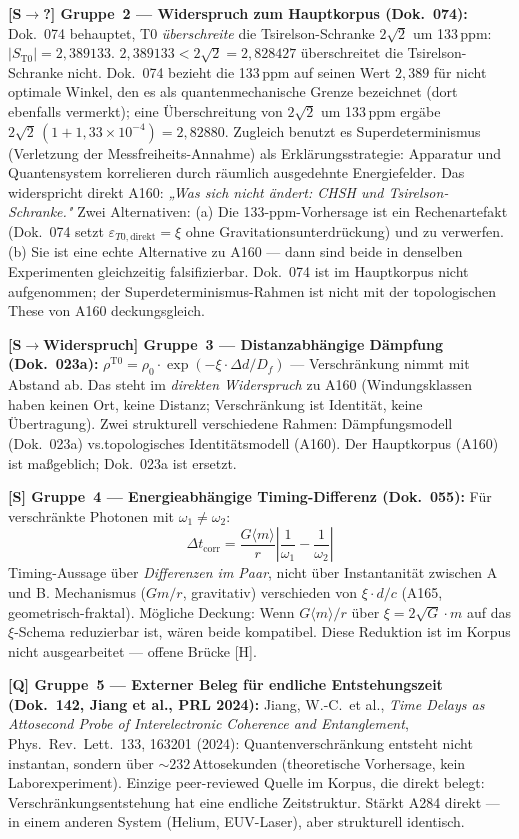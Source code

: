 \textbf{[S$\to$?] Gruppe~2 --- Widerspruch zum Hauptkorpus (Dok.~074):}
Dok.~074 behauptet, T0 \emph{überschreite} die Tsirelson-Schranke $2\sqrt{2}$
um 133\,ppm: $|S_{\mathrm{T0}}| = 2{,}389133$. $2{,}389133 < 2\sqrt2 = 2{,}828427$ überschreitet die Tsirelson-Schranke nicht. Dok.~074 bezieht die 133\,ppm auf seinen Wert $2{,}389$ für nicht optimale Winkel, den es als quantenmechanische Grenze bezeichnet (dort ebenfalls vermerkt); eine Überschreitung von $2\sqrt2$ um 133\,ppm ergäbe $2\sqrt2\,(1+1{,}33\times10^{-4}) = 2{,}82880$.
Zugleich benutzt es Superdeterminismus (Verletzung der Messfreiheits-Annahme)
als Erklärungsstrategie: Apparatur und Quantensystem korrelieren durch
räumlich ausgedehnte Energiefelder.
Das widerspricht direkt A160: \emph{„Was sich nicht ändert: CHSH und
Tsirelson-Schranke."} Zwei Alternativen:
(a) Die 133-ppm-Vorhersage ist ein Rechenartefakt (Dok.~074 setzt
$\varepsilon_{T0,\text{direkt}} = \xi$ ohne Gravitationsunterdrückung) und
zu verwerfen.
(b) Sie ist eine echte Alternative zu A160 --- dann sind beide in denselben
Experimenten gleichzeitig falsifizierbar.
Dok.~074 ist im Hauptkorpus nicht aufgenommen; der Superdeterminismus-Rahmen
ist nicht mit der topologischen These von A160 deckungsgleich.

\textbf{[S$\to$Widerspruch] Gruppe~3 --- Distanzabhängige Dämpfung (Dok.~023a):}
$\rho^{\mathrm{T0}} = \rho_0\cdot\exp(-\xi\cdot\Delta d/D_f)$ ---
Verschränkung nimmt mit Abstand ab.
Das steht im \emph{direkten Widerspruch} zu A160 (Windungsklassen haben
keinen Ort, keine Distanz; Verschränkung ist Identität, keine Übertragung).
Zwei strukturell verschiedene Rahmen: Dämpfungsmodell (Dok.~023a) vs.topologisches Identitätsmodell (A160).
Der Hauptkorpus (A160) ist maßgeblich; Dok.~023a ist ersetzt.

\textbf{[S] Gruppe~4 --- Energieabhängige Timing-Differenz (Dok.~055):}
Für verschränkte Photonen mit $\omega_1 \ne \omega_2$:
\[
  \Delta t_{\mathrm{corr}} = \frac{G\langle m\rangle}{r}
  \left|\frac{1}{\omega_1} - \frac{1}{\omega_2}\right|
\]
Timing-Aussage über \emph{Differenzen im Paar}, nicht über Instantanität
zwischen A und B. Mechanismus ($Gm/r$, gravitativ) verschieden von
$\xi\cdot d/c$ (A165, geometrisch-fraktal).
Mögliche Deckung: Wenn $G\langle m\rangle/r$ über $\xi = 2\sqrt{G}\cdot m$
auf das $\xi$-Schema reduzierbar ist, wären beide kompatibel.
Diese Reduktion ist im Korpus nicht ausgearbeitet --- offene Brücke [H].

\textbf{[Q] Gruppe~5 --- Externer Beleg für endliche Entstehungszeit
(Dok.~142, Jiang et al., PRL 2024):}
Jiang, W.-C.~et al., \emph{Time Delays as Attosecond Probe of
Interelectronic Coherence and Entanglement},
Phys.\ Rev.\ Lett.\ 133, 163201 (2024):
Quantenverschränkung entsteht nicht instantan, sondern über
$\sim 232$\,Attosekunden (theoretische Vorhersage, kein Laborexperiment).
Einzige peer-reviewed Quelle im Korpus, die direkt belegt:
Verschränkungsentstehung hat eine endliche Zeitstruktur.
Stärkt A284 direkt --- in einem anderen System (Helium, EUV-Laser),
aber strukturell identisch.

